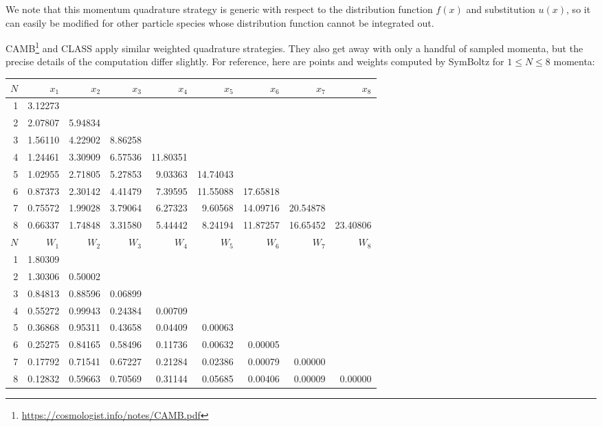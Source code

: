\documentclass{aa}
\begin{document}
We note that this momentum quadrature strategy is generic with respect to the distribution function $f(x)$ and substitution $u(x)$, so it can easily be modified for other particle species whose distribution function cannot be integrated out.

CAMB\footnote{\url{https://cosmologist.info/notes/CAMB.pdf}} and CLASS \citep{lesgourguesCosmicLinearAnisotropy2011a} apply similar weighted quadrature strategies.
They also get away with only a handful of sampled momenta, but the precise details of the computation differ slightly.
For reference, here are points and weights computed by SymBoltz for $1 \leq N \leq 8$ momenta:
\begin{center}
\begin{tabular}{  r r r r r r r r r  } 
\toprule
$N$ & $x_1$ & $x_2$ & $x_3$ & $x_4$ & $x_5$ & $x_6$ & $x_7$ & $x_8$ \\
\midrule
1 & 3.12273 & & & & & & & \\
2 & 2.07807 & 5.94834 & & & & & & \\
3 & 1.56110 & 4.22902 & 8.86258 & & & & & \\
4 & 1.24461 & 3.30909 & 6.57536 & 11.80351 & & & & \\
5 & 1.02955 & 2.71805 & 5.27853 & 9.03363 & 14.74043 & & & \\
6 & 0.87373 & 2.30142 & 4.41479 & 7.39595 & 11.55088 & 17.65818 & & \\
7 & 0.75572 & 1.99028 & 3.79064 & 6.27323 & 9.60568 & 14.09716 & 20.54878 & \\
8 & 0.66337 & 1.74848 & 3.31580 & 5.44442 & 8.24194 & 11.87257 & 16.65452 & 23.40806 \\
\midrule
$N$ & $W_1$ & $W_2$ & $W_3$ & $W_4$ & $W_5$ & $W_6$ & $W_7$ & $W_8$ \\
\midrule
1 & 1.80309 & & & & & & & \\
2 & 1.30306 & 0.50002 & & & & & & \\
3 & 0.84813 & 0.88596 & 0.06899 & & & & & \\
4 & 0.55272 & 0.99943 & 0.24384 & 0.00709 & & & & \\
5 & 0.36868 & 0.95311 & 0.43658 & 0.04409 & 0.00063 & & & \\
6 & 0.25275 & 0.84165 & 0.58496 & 0.11736 & 0.00632 & 0.00005 & & \\
7 & 0.17792 & 0.71541 & 0.67227 & 0.21284 & 0.02386 & 0.00079 & 0.00000 & \\
8 & 0.12832 & 0.59663 & 0.70569 & 0.31144 & 0.05685 & 0.00406 & 0.00009 & 0.00000 \\
\bottomrule
\end{tabular}
\end{center}
\end{document}
